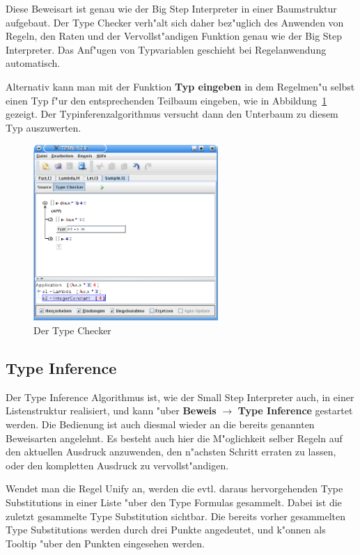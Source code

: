 Diese Beweisart ist genau wie der Big Step Interpreter in einer
Baumstruktur aufgebaut. Der Type Checker verh"alt sich daher
bez"uglich des Anwenden von Regeln, den Raten und der
Vervollst"andigen Funktion genau wie der Big Step Interpreter. Das
Anf"ugen von Typvariablen geschieht bei Regelanwendung automatisch.

Alternativ kann man mit der Funktion {\bf Typ eingeben} in dem
Regelmen"u selbst einen Typ f"ur den entsprechenden Teilbaum
eingeben, wie in Abbildung~\ref{FigureTypeChecker} gezeigt.
Der Typinferenzalgorithmus versucht dann den Unterbaum zu
diesem Typ auszuwerten.

\begin{figure}[h]
\begin{center}
\includegraphics[width=7cm]{images/type-checker.png}
\caption{Der Type Checker}
\label{FigureTypeChecker}
\end{center}
\end{figure}

\subsection{Type Inference}
Der Type Inference Algorithmus ist, wie der Small Step Interpreter 
auch, in einer Listenstruktur realisiert, und kann "uber {\bf Beweis} 
$\rightarrow$ {\bf Type Inference} gestartet werden. Die Bedienung ist auch diesmal 
wieder an die bereits genannten Beweisarten angelehnt. Es besteht 
auch hier die M"oglichkeit selber Regeln auf den aktuellen Ausdruck
anzuwenden, den n"achsten Schritt erraten zu lassen, oder den kompletten
Ausdruck zu vervollst"andigen.

Wendet man die Regel Unify an, werden die evtl. daraus hervorgehenden
Type Substitutions in einer Liste "uber den Type Formulas gesammelt. 
Dabei ist die zuletzt gesammelte Type Substitution sichtbar. Die bereits
vorher gesammelten Type Substitutions werden durch drei Punkte angedeutet,
und k"onnen als Tooltip "uber den Punkten eingesehen werden.

